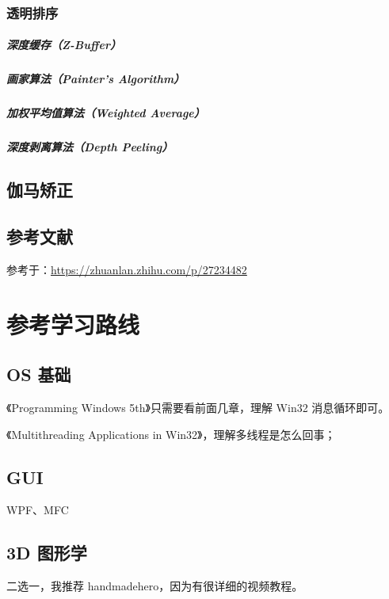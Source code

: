 \documentclass[UTF8,a4paper,12pt]{ctexbook}
\begin{document}
		\subsection{透明排序}
			\paragraph{深度缓存（Z-Buffer）}
			
			\paragraph{画家算法（Painter's Algorithm）}
			
			\paragraph{加权平均值算法（Weighted Average）}
			
			\paragraph{深度剥离算法（Depth Peeling）}

	\section{伽马矫正}
	
	\section{参考文献}
			参考于：\url{https://zhuanlan.zhihu.com/p/27234482}
	


\chapter{参考学习路线}					
	
	\section{OS 基础}
		《Programming Windows 5th》只需要看前面几章，理解 Win32 消息循环即可。
	
		《Multithreading Applications in Win32》，理解多线程是怎么回事；
	
	\section{GUI}
	 	WPF、MFC
	
	\section{3D 图形学}
		二选一，我推荐 handmadehero，因为有很详细的视频教程。
		
\end{document}
